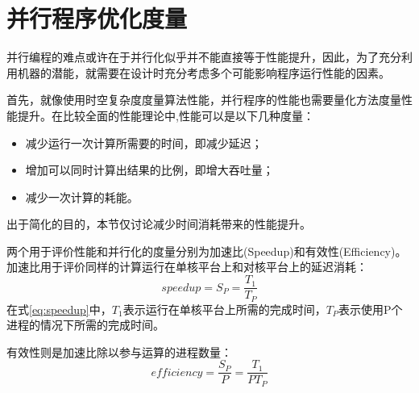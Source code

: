 \section{并行程序优化度量}
并行编程的难点或许在于并行化似乎并不能直接等于性能提升，因此，为了充分利用机器的潜能，就需要在设计时充分考虑多个可能影响程序运行性能的因素。

首先，就像使用时空复杂度度量算法性能，并行程序的性能也需要量化方法度量性能提升。在比较全面的性能理论中\cite{book:pattern},性能可以是以下几种度量：
\begin{itemize}
\item 减少运行一次计算所需要的时间，即减少延迟；
\item 增加可以同时计算出结果的比例，即增大吞吐量；
\item 减少一次计算的耗能。
\end{itemize}
出于简化的目的，本节仅讨论减少时间消耗带来的性能提升。

两个用于评价性能和并行化的度量分别为加速比(Speedup)和有效性(Efficiency)。加速比用于评价同样的计算运行在单核平台上和对核平台上的延迟消耗：
\begin{equation}\label{eq:speedup}
speedup = S_P = \frac{T_1}{T_P}
\end{equation}
在式\ref{eq:speedup}中，$T_1$表示运行在单核平台上所需的完成时间，$T_P$表示使用P个进程的情况下所需的完成时间。

有效性则是加速比除以参与运算的进程数量：
\begin{equation}\label{eq:efficiency}
efficiency = \frac{S_P}{P} = \frac{T_1}{PT_P}
\end{equation}

